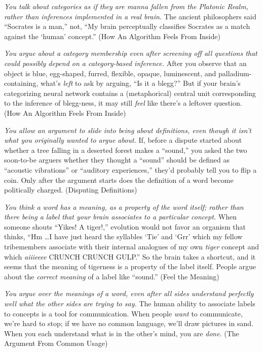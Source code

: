 {
 \textit{You talk about categories as if they are manna fallen from
the Platonic Realm, rather than inferences implemented in a real
brain.} The ancient philosophers said ``Socrates is a
man,'' not, ``My brain perceptually
classifies Socrates as a match against the
`human' concept.''
(How An Algorithm Feels From Inside)}

{
 \textit{You argue about a category membership even after screening
off all questions that could possibly depend on a category-based
inference.} After you observe that an object is blue, egg-shaped,
furred, flexible, opaque, luminescent, and palladium-containing,
what's \textit{left} to ask by arguing,
``Is it a blegg?'' But if your
brain's categorizing neural network contains a
(metaphorical) central unit corresponding to the inference of
blegg-ness, it may still \textit{feel} like there's a
leftover question. (How An Algorithm Feels From Inside)}

{
 \textit{You allow an argument to slide into being about
definitions, even though it isn't what you originally
wanted to argue about.} If, before a dispute started about whether a
tree falling in a deserted forest makes a
``sound,'' you asked the two
soon-to-be arguers whether they thought a
``sound'' should be defined as
``acoustic vibrations'' or
``auditory experiences,''
they'd probably tell you to flip a coin. Only after the
argument starts does the definition of a word become politically
charged. (Disputing Definitions)}

{
 \textit{You think a word has a meaning, as a property of the word
itself; rather than there being a label that your brain associates to a
particular concept.} When someone shouts ``Yikes! A
tiger!,'' evolution would not favor an organism that
thinks, ``Hm \ldots I have just heard the syllables
`Tie' and
`Grr' which my fellow tribemembers
associate with their internal analogues of my own \textit{tiger}
concept and which \textit{aiiieeee} CRUNCH CRUNCH
GULP.'' So the brain takes a shortcut, and it seems
that the meaning of tigerness is a property of the label itself. People
argue about the \textit{correct meaning} of a label like
``sound.'' (Feel the Meaning)}

{
 \textit{You argue over the meanings of a word, even after all
sides understand perfectly well what the other sides are trying to
say.} The human ability to associate labels to concepts is a tool for
communication. When people \textit{want} to communicate,
we're hard to stop; if we have no common language,
we'll draw pictures in sand. When you each understand
what is in the other's mind, you are \textit{done}.
(The Argument From Common Usage)}

